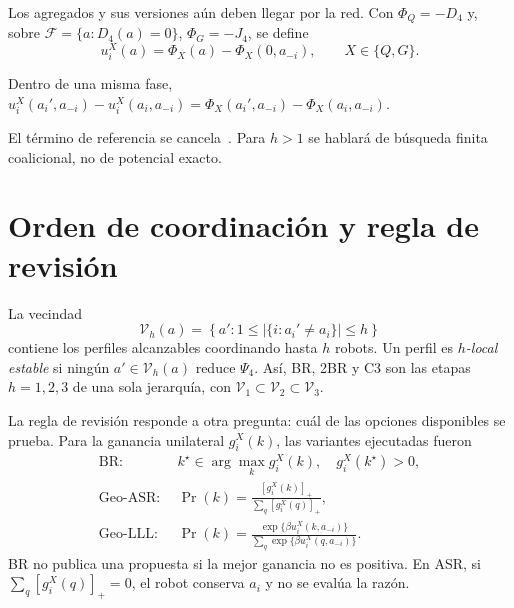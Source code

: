 Los agregados y sus versiones aún deben llegar por la red. Con $\Phi_Q=-D_4$ y,
sobre $\mathcal F=\{a:D_4(a)=0\}$, $\Phi_G=-J_4$, se define
\begin{equation}
\label{eq:n4-wonderful-life}
u_i^X(a)=\Phi_X(a)-\Phi_X(0,a_{-i}),\qquad X\in\{Q,G\}.
\end{equation}

\begin{n1prop}
Dentro de una misma fase,
$u_i^X(a_i',a_{-i})-u_i^X(a_i,a_{-i})
=\Phi_X(a_i',a_{-i})-\Phi_X(a_i,a_{-i})$.
\end{n1prop}
El término de referencia se cancela~\parencite{monderer1996potential}. Para
$h>1$ se hablará de búsqueda finita coalicional, no de potencial exacto.

\clearpage

\section*{Orden de coordinación y regla de revisión}
\enlargethispage{4\baselineskip}

La vecindad
\begin{equation}
\label{eq:n4-h-neighbourhood}
\mathcal V_h(a)=\left\{a':1\leq
\left|\{i:a_i'\neq a_i\}\right|\leq h\right\}
\end{equation}
contiene los perfiles alcanzables coordinando hasta $h$ robots. Un perfil es
\emph{$h$-local estable} si ningún $a'\in\mathcal V_h(a)$ reduce
$\Psi_4$. Así, BR, 2BR y C3 son las etapas $h=1,2,3$ de una sola jerarquía,
con $\mathcal V_1\subset\mathcal V_2\subset\mathcal V_3$.

La regla de revisión responde a otra pregunta: cuál de las opciones disponibles
se prueba. Para la ganancia unilateral $g_i^X(k)$, las variantes ejecutadas
fueron
\begin{equation}
\label{eq:n4-revision-rules}
\begin{aligned}
\mathrm{BR}:\;&k^\star\in\arg\max_k g_i^X(k),\quad
g_i^X(k^\star)>0,\\[-1mm]
\mathrm{Geo\mbox{-}ASR}:\;&
\Pr(k)=\frac{[g_i^X(k)]_+}{\sum_q[g_i^X(q)]_+},\\[-1mm]
\mathrm{Geo\mbox{-}LLL}:\;&
\Pr(k)=\frac{\exp\{\beta u_i^X(k,a_{-i})\}}
{\sum_q\exp\{\beta u_i^X(q,a_{-i})\}}.
\end{aligned}
\end{equation}
BR no publica una propuesta si la mejor ganancia no es positiva. En ASR, si
$\sum_q[g_i^X(q)]_+=0$, el robot conserva $a_i$ y no se evalúa la razón.

